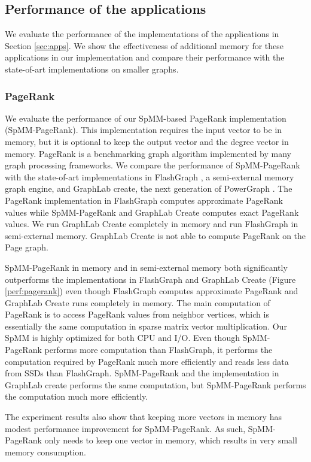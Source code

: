 \subsection{Performance of the applications}

We evaluate the performance of the implementations of the applications in
Section \ref{sec:apps}. We show the effectiveness of additional memory for
these applications in our implementation and compare their performance
with the state-of-art implementations on smaller graphs.

\subsubsection{PageRank}
We evaluate the performance of our SpMM-based PageRank implementation
(SpMM-PageRank). This implementation requires the input vector to be in memory,
but it is optional to keep the output vector and the degree vector in memory.
PageRank is a benchmarking graph algorithm implemented by many graph processing
frameworks. We compare the performance of SpMM-PageRank with the state-of-art
implementations in FlashGraph \cite{flashgraph}, a semi-external memory graph
engine, and GraphLab create, the next generation of PowerGraph \cite{powergraph}.
The PageRank implementation in FlashGraph computes
approximate PageRank values while SpMM-PageRank and GraphLab Create computes
exact PageRank values. We run GraphLab Create completely in memory and run
FlashGraph in semi-external memory. GraphLab Create is not able to compute
PageRank on the Page graph.

SpMM-PageRank in memory and in semi-external memory both significantly outperforms
the implementations in FlashGraph and GraphLab Create (Figure \ref{perf:pagerank})
even though FlashGraph computes approximate PageRank and GraphLab Create runs
completely in memory. The main computation of PageRank is to access PageRank
values from neighbor vertices, which is essentially the same computation in
sparse matrix vector multiplication. Our SpMM is highly optimized for both CPU
and I/O. Even though SpMM-PageRank performs more computation than FlashGraph,
it performs the computation required by PageRank much more efficiently and
reads less data from SSDs than FlashGraph. SpMM-PageRank and the implementation
in GraphLab create performs the same computation, but SpMM-PageRank
performs the computation much more efficiently.

The experiment results also show that keeping more vectors in memory has modest
performance improvement for SpMM-PageRank. As such, SpMM-PageRank only needs
to keep one vector in memory, which results in very small memory consumption.

